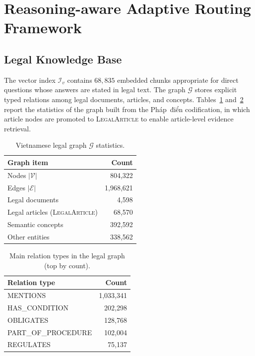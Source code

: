 ﻿\documentclass[11pt,twocolumn]{article}
\begin{document}
\FloatBarrier

\section{Reasoning-aware Adaptive Routing Framework}
\label{sec:routing_framework}

\subsection{Legal Knowledge Base}
\label{subsec:legal_kb}

The vector index $\mathcal{I}_v$ contains $68{,}835$ embedded chunks
appropriate for direct questions whose answers are stated in legal text.
The graph $\mathcal{G}$ stores explicit typed relations among legal
documents, articles, and concepts.
Tables~\ref{tab:graph_stats} and~\ref{tab:graph_relations} report the
statistics of the graph built from the Pháp~điển codification, in which
article nodes are promoted to \textsc{LegalArticle} to enable
article-level evidence retrieval.

\begin{table}[!htbp]
\centering
\caption{Vietnamese legal graph $\mathcal{G}$ statistics.}
\label{tab:graph_stats}
\small
\begin{tabular}{lr}
\toprule
\textbf{Graph item} & \textbf{Count} \\
\midrule
Nodes $|\mathcal{V}|$ & 804,322 \\
Edges $|\mathcal{E}|$ & 1,968,621 \\
Legal documents & 4,598 \\
Legal articles (\textsc{LegalArticle}) & 68,570 \\
Semantic concepts & 392,592 \\
Other entities & 338,562 \\
\bottomrule
\end{tabular}
\end{table}

\begin{table}[!htbp]
\centering
\caption{Main relation types in the legal graph (top by count).}
\label{tab:graph_relations}
\small
\begin{tabular}{lr}
\toprule
\textbf{Relation type} & \textbf{Count} \\
\midrule
\textsc{MENTIONS} & 1,033,341 \\
\textsc{HAS\_CONDITION} & 202,298 \\
\textsc{OBLIGATES} & 128,768 \\
\textsc{PART\_OF\_PROCEDURE} & 102,004 \\
\textsc{REGULATES} & 75,137 \\
\bottomrule
\end{tabular}
\end{table}
\end{document}
